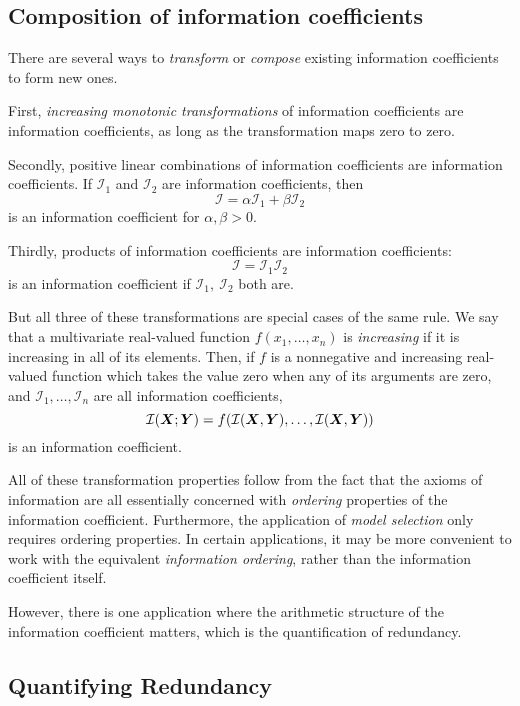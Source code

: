 \documentclass[12pt]{article}
\begin{document}
\subsection{Composition of information coefficients}

There are several ways to \emph{transform} or \emph{compose} existing
information coefficients to form new ones.  

First, \emph{increasing monotonic transformations} of information
coefficients are information coefficients, as long as the
transformation maps zero to zero.  

Secondly, positive linear combinations of information coefficients are
information coefficients.  If $\mathcal{I}_1$ and $\mathcal{I}_2$ are information coefficients, then
\[
\mathcal{I} = \alpha \mathcal{I}_1 + \beta \mathcal{I}_2
\]
is an information coefficient for $\alpha, \beta > 0$.

Thirdly, products of information coefficients are information coefficients:
\[
\mathcal{I} = \mathcal{I}_1 \mathcal{I}_2
\]
is an information coefficient if $\mathcal{I}_1,\ \mathcal{I}_2$ both are.

But all three of these transformations are special cases of the same
rule.  We say that a multivariate real-valued function $f(x_1,\hdots,
x_n)$ is \emph{increasing}
 if it is increasing in all of its elements.  Then, if $f$ is a
nonnegative and increasing real-valued function which takes the value
zero when any of its arguments are zero, and
$\mathcal{I}_1,\hdots, \mathcal{I}_n$ are all information
coefficients,
\[
\mathcal{I}(\boldsymbol{X}; \boldsymbol{Y}) = f(\mathcal{I}(\boldsymbol{X}, \boldsymbol{Y}),\hdots, \mathcal{I}(\boldsymbol{X}, \boldsymbol{Y}))
\]
is an information coefficient.

All of these transformation properties follow from the fact that the
axioms of information are all essentially concerned
with \emph{ordering} properties of the information coefficient.
Furthermore, the application of \emph{model selection} only requires
ordering properties. In certain applications, it may be more
convenient to work with the equivalent \emph{information ordering},
rather than the information coefficient itself.

However, there is one application where the arithmetic structure of
the information coefficient matters, which is the quantification of
redundancy.

\subsection{Quantifying Redundancy}\label{sec:redundancy}
\end{document}
